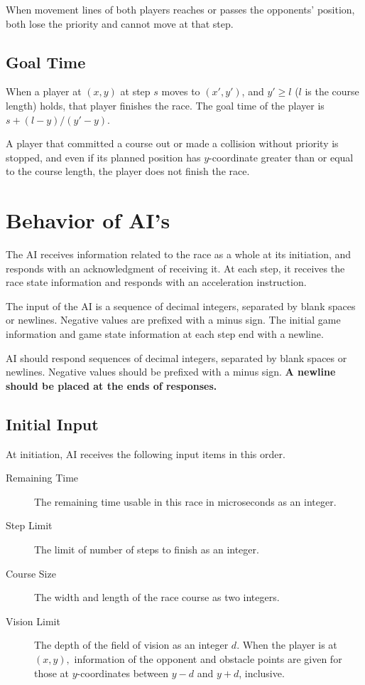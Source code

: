 \documentclass[11pt]{article}
\begin{document}
When movement lines of both players reaches or passes the opponents'
position, both lose the priority and cannot move at that step.

\subsection{Goal Time}
When a player at $(x, y)$ at step $s$ moves to $(x', y')$, and $y'\ge
l$ ($l$ is the course length) holds, that player finishes the race.
The goal time of the player is $s + (l-y)/(y'-y).$

A player that committed a course out or made a collision without
priority is stopped, and even if its planned position has
$y$-coordinate greater than or equal to the course length, the player
does not finish the race.

\section{Behavior of AI's}

The AI receives information related to the race as a whole at its
initiation, and responds with an acknowledgment of receiving it.  At
each step, it receives the race state information and responds with an
acceleration instruction.

The input of the AI is a sequence of decimal integers, separated by
blank spaces or newlines.  Negative values are prefixed with a minus
sign.  The initial game information and game state information at each
step end with a newline.

AI should respond sequences of decimal integers, separated by blank
spaces or newlines.  Negative values should be prefixed with a minus
sign.  {\bf A newline should be placed at the ends of responses.}

\subsection{Initial Input}
At initiation, AI receives the following input items in this order.
\begin{description}
\item[Remaining Time] The remaining time usable in this race in
  microseconds as an integer.
\item[Step Limit] The limit of number of steps to finish as an integer.
\item[Course Size] The width and length of the race course as two integers.
\item[Vision Limit] The depth of the field of vision as an integer
  $d.$ When the player is at $(x, y),$ information of the opponent and
  obstacle points are given for those at $y$-coordinates between $y-d$
  and $y+d$, inclusive.
\end{description}
\end{document}

